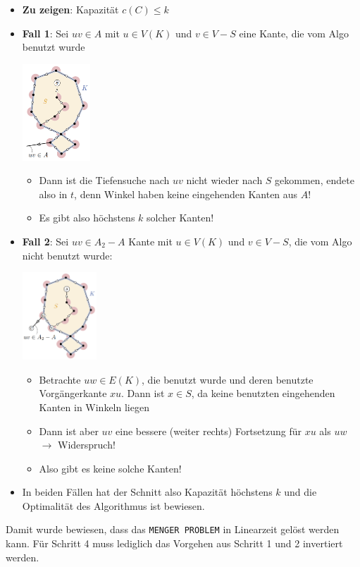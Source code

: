 \begin{itemize}
	\item \textbf{Zu zeigen}: Kapazität $c(C)\leq k$
	\item \textbf{Fall 1}: Sei $uv\in A$ mit $u\in V(K)$ und $v\in V-S$ eine Kante, die vom Algo benutzt wurde
	\begin{center}
		\includegraphics[width=0.2\textwidth]{images/menger-8.png}
	\end{center}
	\begin{itemize}
		\item Dann ist die Tiefensuche nach $uv$ nicht wieder nach $S$ gekommen, endete also in $t$, denn Winkel haben keine eingehenden Kanten aus $A$!
		\item Es gibt also höchstens $k$ solcher Kanten!
	\end{itemize}
	\item \textbf{Fall 2}: Sei $uv\in A_2-A$ Kante mit $u\in V(K)$ und $v\in V-S$, die vom Algo nicht benutzt wurde:
	\begin{center}
		\includegraphics[width=0.22\textwidth]{images/menger-9.png}
	\end{center}
	\begin{itemize}
		\item Betrachte $uw\in E(K)$, die benutzt wurde und deren benutzte Vorgängerkante $xu$. Dann ist $x\in S$, da keine benutzten eingehenden Kanten in Winkeln liegen
		\item Dann ist aber $uv$ eine bessere (weiter rechts) Fortsetzung für
		$xu$ als $uw$ $\rightarrow$ Widerspruch!
		\item Also gibt es keine solche Kanten!
	\end{itemize}
	\item In beiden Fällen hat der Schnitt also Kapazität höchstens $k$ und die Optimalität des Algorithmus ist bewiesen.
\end{itemize}

Damit wurde bewiesen, dass das \texttt{MENGER PROBLEM} in Linearzeit gelöst werden kann. Für Schritt 4 muss lediglich das Vorgehen aus Schritt 1 und 2 invertiert werden.
